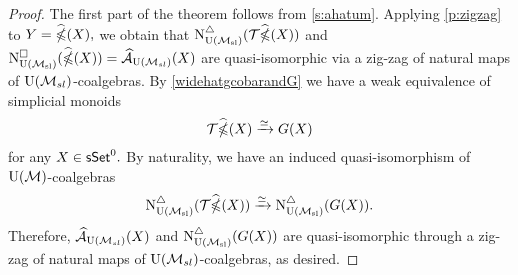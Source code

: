 \begin{proof}
	The first part of the theorem follows from \cref{s:ahatum}. 
	Applying \cref{p:zigzag} to $Y= \widehat{\ccobar}(X),$ we obtain that $\schainsUSL (\mathcal{T} \widehat{\ccobar}(X))$ and $\cchainsUSL(\widehat{\ccobar}(X)) = \Ahat_{\USL}(X)$ are quasi-isomorphic via a zig-zag of natural maps of $\USL$-coalgebras. By \cref{widehatgcobarandG} we have a weak equivalence of simplicial monoids
	$$\mathcal{T}\widehat{\ccobar}(X) \xrightarrow{\simeq} G(X)$$ for any $X \in \sSet^0.$ By naturality, we have an induced quasi-isomorphism of $\UM$-coalgebras
	$$\schainsUSL(\mathcal{T}\widehat{\ccobar}(X)) \xra{\simeq} \schainsUSL(G(X)).$$
	Therefore, $\Ahat_{\USL}(X)$ and $\schainsUSL(G(X))$ are quasi-isomorphic through a zig-zag of natural maps of $\USL$-coalgebras, as desired.
\end{proof}